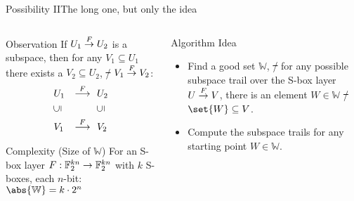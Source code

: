 \begin{frame}{Possibility II}{The long one, but only the idea}
    \begin{columns}[t,onlytextwidth]
        \begin{column}{0.55\textwidth}
            \begin{block}{Observation\vphantom{g}}
                \vspace{0.25em}
                If $U_1 \stackrel{F}{\rightarrow} U_2$ is a subspace, then for any $V_1 \subseteq U_1$ there exists a $V_2 \subseteq U_2$, \st/ $V_1 \stackrel{F}{\rightarrow} V_2$:
                \begin{equation*}
                \begin{aligned}
                    & U_1 & \stackrel{F}{\longrightarrow}\ &\ U_2 \\
                    & \rotatebox[origin=c]{90}{$\subseteq$} & &\ \rotatebox[origin=c]{90}{$\subseteq$} \\
                    & V_1 & \stackrel{F}{\longrightarrow}\ &\ V_2
                \end{aligned}
                \end{equation*}
            \end{block}
            \begin{block}{Complexity (Size of $\mathbb{W}$)}
                For an S-box layer $F : \mathbb{F}_2^{kn} \to \mathbb{F}_2^{kn}$ with $k$ S-boxes, each $n$-bit: $\abs{\mathbb{W}} = k \cdot 2^n$
            \end{block}
        \end{column}
        \begin{column}{0.4\textwidth}
            \begin{block}{Algorithm Idea}
                \vspace{1em}
                \begin{itemize}
                    \item Find a good set $\mathbb{W}$, \st/ for any possible subspace trail over the S-box layer $U \stackrel{F}{\rightarrow} V$, there is an element $W \in \mathbb{W}$ \st/ $\set{W} \subseteq V$.
                \vspace{1em}
                    \item Compute the subspace trails for any starting point $W \in \mathbb{W}$.
                \end{itemize}
                \vspace{1em}
            \end{block}
        \end{column}
    \end{columns}
\end{frame}

